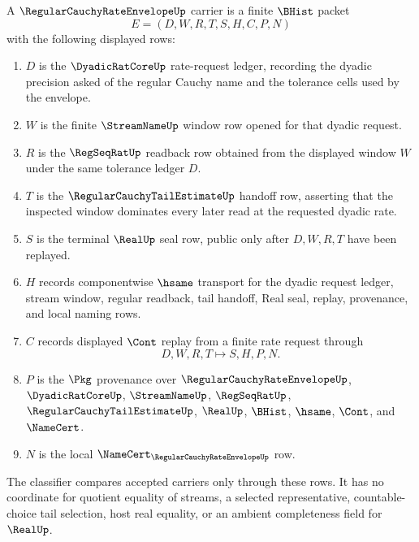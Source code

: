 \begin{definition}
\label{def:regular-cauchy-rate-envelope-carrier}
A $\RegularCauchyRateEnvelopeUp$ carrier is a finite $\BHist$ packet
$$
E=(D,W,R,T,S,H,C,P,N)
$$
with the following displayed rows:
\begin{enumerate}
\item $D$ is the $\DyadicRatCoreUp$ rate-request ledger, recording the dyadic precision asked of the regular Cauchy name and the tolerance cells used by the envelope.
\item $W$ is the finite $\StreamNameUp$ window row opened for that dyadic request.
\item $R$ is the $\RegSeqRatUp$ readback row obtained from the displayed window $W$ under the same tolerance ledger $D$.
\item $T$ is the $\RegularCauchyTailEstimateUp$ handoff row, asserting that the inspected window dominates every later read at the requested dyadic rate.
\item $S$ is the terminal $\RealUp$ seal row, public only after $D,W,R,T$ have been replayed.
\item $H$ records componentwise $\hsame$ transport for the dyadic request ledger, stream window, regular readback, tail handoff, Real seal, replay, provenance, and local naming rows.
\item $C$ records displayed $\Cont$ replay from a finite rate request through
$$
D,W,R,T \longmapsto S,H,P,N .
$$
\item $P$ is the $\Pkg$ provenance over $\RegularCauchyRateEnvelopeUp$, $\DyadicRatCoreUp$, $\StreamNameUp$, $\RegSeqRatUp$, $\RegularCauchyTailEstimateUp$, $\RealUp$, $\BHist$, $\hsame$, $\Cont$, and $\NameCert$.
\item $N$ is the local $\NameCert_{\RegularCauchyRateEnvelopeUp}$ row.
\end{enumerate}
The classifier compares accepted carriers only through these rows. It has no coordinate for quotient equality of streams, a selected representative, countable-choice tail selection, host real equality, or an ambient completeness field for $\RealUp$.
\end{definition}

